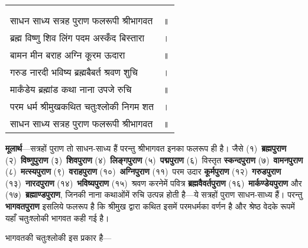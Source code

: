 {
{\bfseries
\setlength{\mylenone}{0pt}
\settowidth{\mylentwo}{}
\setlength{\mylenone}{\maxof{\mylenone}{\mylentwo}}
\settowidth{\mylentwo}{साधन साध्य सत्रह पुराण फलरूपी श्रीभागवत}
\setlength{\mylenone}{\maxof{\mylenone}{\mylentwo}}
\settowidth{\mylentwo}{ब्रह्म विष्णु शिव लिंग पदम अस्कँद बिस्तारा}
\setlength{\mylenone}{\maxof{\mylenone}{\mylentwo}}
\settowidth{\mylentwo}{बामन मीन बराह अग्नि कूरम ऊदारा}
\setlength{\mylenone}{\maxof{\mylenone}{\mylentwo}}
\settowidth{\mylentwo}{गरुड नारदी भविष्य ब्रह्मबैबर्त श्रवण शुचि}
\setlength{\mylenone}{\maxof{\mylenone}{\mylentwo}}
\settowidth{\mylentwo}{मार्कंडेय ब्रह्मांड कथा नाना उपजे रुचि}
\setlength{\mylenone}{\maxof{\mylenone}{\mylentwo}}
\settowidth{\mylentwo}{परम धर्म श्रीमुखकथित चतुःश्लोकी निगम शत}
\setlength{\mylenone}{\maxof{\mylenone}{\mylentwo}}
\settowidth{\mylentwo}{साधन साध्य सत्रह पुराण फलरूपी श्रीभागवत}
\setlength{\mylenone}{\maxof{\mylenone}{\mylentwo}}
\setlength{\mylentwo}{\baselineskip}
\setlength{\mylenone}{\mylenone + 1pt}
\begin{longtable}[l]{@{\hspace*{\mylen}}>{\setlength\parfillskip{0pt}}p{\mylenone}@{}@{}l@{}}
 & \\[-\the\mylentwo]
\centering{॥ १७ \hspace*{-1.5mm}॥} & \\ \nopagebreak
साधन साध्य सत्रह पुराण फलरूपी श्रीभागवत & ॥\\
ब्रह्म विष्णु शिव लिंग पदम अस्कँद बिस्तारा & ।\\ \nopagebreak
बामन मीन बराह अग्नि कूरम ऊदारा & ॥\\
गरुड नारदी भविष्य ब्रह्मबैबर्त श्रवण शुचि & ।\\ \nopagebreak
मार्कंडेय ब्रह्मांड कथा नाना उपजे रुचि & ॥\\
परम धर्म श्रीमुखकथित चतुःश्लोकी निगम शत & ।\\ \nopagebreak
साधन साध्य सत्रह पुराण फलरूपी श्रीभागवत & ॥
\end{longtable}
}
}
\begin{sloppypar}\justifying{}
\textbf{मूलार्थ}—सत्रहों पुराण तो साधन-साध्य हैं परन्तु श्रीभागवत इनका फलरूप ही है। जैसे (१)~\textbf{ब्रह्मपुराण} (२)~\textbf{विष्णुपुराण} (३)~\textbf{शिवपुराण} (४)~\textbf{लिङ्गपुराण} (५)~\textbf{पद्मपुराण} (६)~विस्तृत \textbf{स्कन्दपुराण} (७)~\textbf{वामनपुराण} (८)~\textbf{मत्स्यपुराण} (९)~\textbf{वराहपुराण} (१०)~\textbf{अग्निपुराण} (११)~परम उदार \textbf{कूर्मपुराण} (१२)~\textbf{गरुडपुराण} (१३)~\textbf{नारदपुराण} (१४)~\textbf{भविष्यपुराण} (१५)~श्रवण करनेमें पवित्र \textbf{ब्रह्मवैवर्तपुराण} (१६)~\textbf{मार्कण्डेयपुराण} और (१७)~\textbf{ब्रह्माण्डपुराण}, जिनकी नाना कथाओंमें रुचि उत्पन्न होती है—ये सत्रहों पुराण साधन-साध्य हैं। परन्तु \textbf{भागवतपुराण} इसलिये फलरूप है कि श्रीमुख द्वारा कथित इसमें परमधर्मका वर्णन है और श्रेष्ठ वेदके रूपमें यहाँ चतुःश्लोकी भागवत कही गई है।
\end{sloppypar}
\begin{sloppypar}\justifying{}
भागवतकी चतुःश्लोकी इस प्रकार है—
\end{sloppypar}

